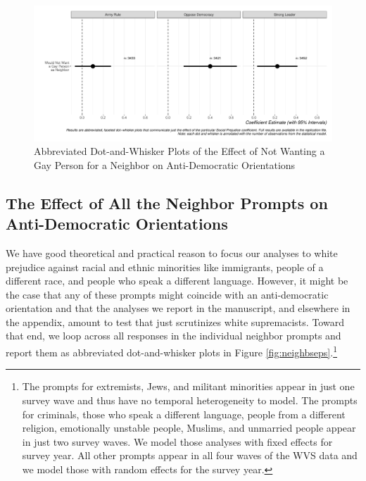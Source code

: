 \documentclass[11pt,]{article}
\begin{document}
\begin{figure}
\centering
\includegraphics{figs/lgbtseps.pdf}
\caption{\label{fig:lgbtseps}Abbreviated Dot-and-Whisker Plots of the
Effect of Not Wanting a Gay Person for a Neighbor on Anti-Democratic
Orientations}
\end{figure}

\hypertarget{the-effect-of-all-the-neighbor-prompts-on-anti-democratic-orientations}{%
\subsection{The Effect of All the Neighbor Prompts on Anti-Democratic
Orientations}\label{the-effect-of-all-the-neighbor-prompts-on-anti-democratic-orientations}}

We have good theoretical and practical reason to focus our analyses to
white prejudice against racial and ethnic minorities like immigrants,
people of a different race, and people who speak a different language.
However, it might be the case that any of these prompts might coincide
with an anti-democratic orientation and that the analyses we report in
the manuscript, and elsewhere in the appendix, amount to test that just
scrutinizes white supremacists. Toward that end, we loop across all
responses in the individual neighbor prompts and report them as
abbreviated dot-and-whisker plots in Figure
\ref{fig:neighbseps}.\footnote{The prompts for extremists, Jews, and
  militant minorities appear in just one survey wave and thus have no
  temporal heterogeneity to model. The prompts for criminals, those who
  speak a different language, people from a different religion,
  emotionally unstable people, Muslims, and unmarried people appear in
  just two survey waves. We model those analyses with fixed effects for
  survey year. All other prompts appear in all four waves of the WVS
  data and we model those with random effects for the survey year.}
\end{document}
